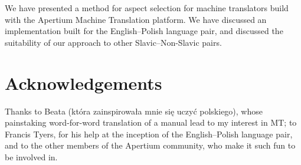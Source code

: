 \documentclass[11pt]{article}
\begin{document}
We have presented a method for aspect selection for machine translators
build with the Apertium Machine Translation platform. We have discussed
an implementation built for the English--Polish language pair, and
discussed the suitability of our approach to other Slavic--Non-Slavic 
pairs.

\section{Acknowledgements}

Thanks to Beata (kt\'{o}ra zainspirowa\l{}a mnie si\k{e} uczy\'{c} polskiego),
whose painstaking word-for-word translation of a manual lead to my 
interest in MT; to Francis Tyers, for his help at the inception of the
English--Polish language pair, and to the other members of the Apertium
community, who make it such fun to be involved in.



\end{document}
